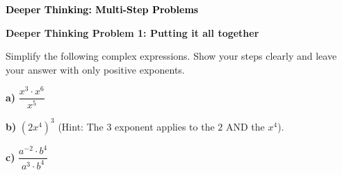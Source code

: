 \documentclass[12pt, letterpaper, fleqn]{article}
\begin{document}
\vspace{4mm}

\begin{tcolorbox}[colback=customteal!20]
\large\textcolor{black}{\textbf{Deeper Thinking: Multi-Step Problems}}
\end{tcolorbox}

\vspace{3mm}

\begin{tcolorbox}[colback=white!15, colframe=black, boxrule=1.5pt, arc=4mm, left=6mm, right=6mm, top=5mm, bottom=5mm]

\textbf{Deeper Thinking Problem 1: Putting it all together}

\medskip

\noindent
Simplify the following complex expressions. Show your steps clearly and leave your answer with only positive exponents.

\vspace{5mm}

\noindent
\textbf{a)} $\dfrac{x^3 \cdot x^6}{x^5}$

\vspace{3cm}

\noindent
\textbf{b)} $(2x^4)^3$ (Hint: The $3$ exponent applies to the $2$ AND the $x^4$).

\vspace{3cm}

\noindent
\textbf{c)} $\dfrac{a^{-2} \cdot b^4}{a^3 \cdot b^4}$

\vspace{4cm}

\end{tcolorbox}
\end{document}
